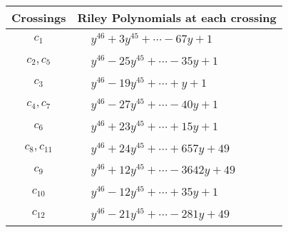 \documentclass[1p]{elsarticle_modified}
\theoremstyle{definition}
\begin{document}
\begin{tabular}{m{50pt}|m{274pt}}
Crossings & \hspace{64pt}Riley Polynomials at each crossing \\
\hline $$\begin{aligned}c_{1}\end{aligned}$$&$\begin{aligned}
&y^{46}+3 y^{45}+\cdots-67 y+1
\end{aligned}$\\
\hline $$\begin{aligned}c_{2},c_{5}\end{aligned}$$&$\begin{aligned}
&y^{46}-25 y^{45}+\cdots-35 y+1
\end{aligned}$\\
\hline $$\begin{aligned}c_{3}\end{aligned}$$&$\begin{aligned}
&y^{46}-19 y^{45}+\cdots+y+1
\end{aligned}$\\
\hline $$\begin{aligned}c_{4},c_{7}\end{aligned}$$&$\begin{aligned}
&y^{46}-27 y^{45}+\cdots-40 y+1
\end{aligned}$\\
\hline $$\begin{aligned}c_{6}\end{aligned}$$&$\begin{aligned}
&y^{46}+23 y^{45}+\cdots+15 y+1
\end{aligned}$\\
\hline $$\begin{aligned}c_{8},c_{11}\end{aligned}$$&$\begin{aligned}
&y^{46}+24 y^{45}+\cdots+657 y+49
\end{aligned}$\\
\hline $$\begin{aligned}c_{9}\end{aligned}$$&$\begin{aligned}
&y^{46}+12 y^{45}+\cdots-3642 y+49
\end{aligned}$\\
\hline $$\begin{aligned}c_{10}\end{aligned}$$&$\begin{aligned}
&y^{46}-12 y^{45}+\cdots+35 y+1
\end{aligned}$\\
\hline $$\begin{aligned}c_{12}\end{aligned}$$&$\begin{aligned}
&y^{46}-21 y^{45}+\cdots-281 y+49
\end{aligned}$\\
\hline
\end{tabular}\\~\\
\end{document}
